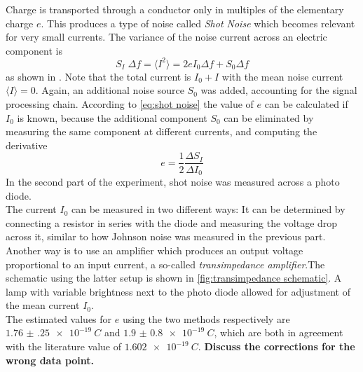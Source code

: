 \documentclass[
    parskip=half, 
    twoside=false,
    twocolumn=true,
    fontsize=11pt,
]{scrarticle}
\begin{document}
Charge is transported through a conductor only in multiples of the elementary charge $e$. This produces a type of noise called \textit{Shot Noise} which becomes relevant for very small currents. The variance of the noise current across an electric component is
\begin{equation}
    \label{eq:shot noise}
    S_I\;\Delta f = \langle I^2 \rangle = 2 e I_0 \Delta f + S_0 \Delta f
\end{equation}
as shown in \autocite{Buch}. Note that the total current is $I_0 + I$ with the mean noise current $\langle I \rangle = 0$. Again, an additional noise source $S_0$ was added, accounting for the signal processing chain. According to \autoref{eq:shot noise} the value of $e$ can be calculated if $I_0$ is known, because the additional component $S_0$ can be eliminated by measuring the same component at different currents, and computing the derivative
\begin{equation}
 e = \frac{1}{2}\frac{\Delta S_I}{\Delta I_0}
\end{equation}
In the second part of the experiment, shot noise was measured across a photo diode. \\
The current $I_0$ can be measured in two different ways: It can be determined by connecting a resistor in series with the diode and measuring the voltage drop across it, similar to how Johnson noise was measured in the previous part. Another way is to use an amplifier which produces an output voltage proportional to an input current, a so-called \textit{transimpedance amplifier}.The schematic using the latter setup is shown in \autoref{fig:transimpedance schematic}. A lamp with variable brightness next to the photo diode allowed for adjustment of the mean current $I_0$.\\
The estimated values for $e$ using the two methods respectively are $\SI{1.76(25)e-19}{C}$ and $\SI{1.9(08)e-19}{C}$, which are both in agreement with the literature value of $\SI{1.602e-19}{C}$.
\textbf{Discuss the corrections for the wrong data point.}
\end{document}
